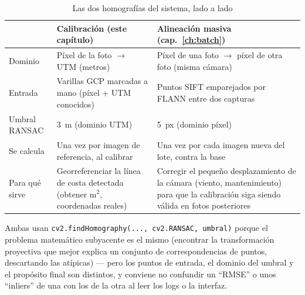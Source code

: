 \begin{table}[H]
\centering
\caption{Las dos homografías del sistema, lado a lado}
\label{tab:dos-homografias}
\begin{tabularx}{\textwidth}{L{3.4cm} X X}
\toprule
\textbf{} & \textbf{Calibración (este capítulo)} & \textbf{Alineación masiva (cap.~\ref{ch:batch})} \\
\midrule
Dominio & Píxel de la foto $\rightarrow$ UTM (metros) & Píxel de una foto $\rightarrow$ píxel de
  otra foto (misma cámara) \\
Entrada & Varillas GCP marcadas a mano (píxel + UTM conocidos) & Puntos SIFT emparejados por
  FLANN entre dos capturas \\
Umbral RANSAC & 3~m (dominio UTM) & 5~px (dominio píxel) \\
Se calcula & Una vez por imagen de referencia, al calibrar & Una vez por cada imagen nueva del
  lote, contra la base \\
Para qué sirve & Georreferenciar la línea de costa detectada (obtener m$^2$, coordenadas reales) &
  Corregir el pequeño desplazamiento de la cámara (viento, mantenimiento) para que la
  calibración siga siendo válida en fotos posteriores \\
\bottomrule
\end{tabularx}
\end{table}

Ambas usan \texttt{cv2.findHomography(..., cv2.RANSAC, umbral)} porque el problema matemático
subyacente es el mismo (encontrar la transformación proyectiva que mejor explica un conjunto de
correspondencias de puntos, descartando las atípicas) — pero los puntos de entrada, el dominio
del umbral y el propósito final son distintos, y conviene no confundir un ``RMSE'' o unos
``inliers'' de una con los de la otra al leer los logs o la interfaz.


